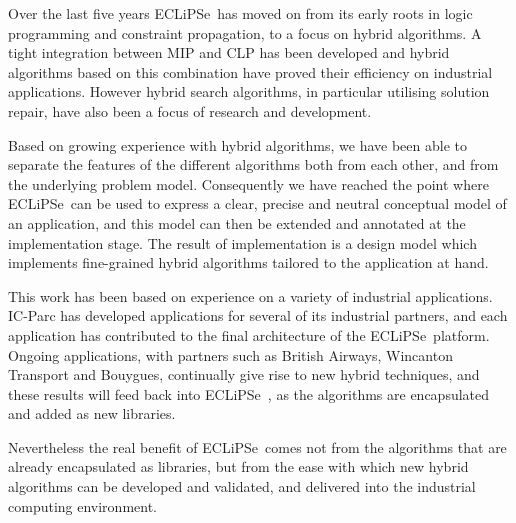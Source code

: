 \documentclass[a4wide]{article}
\newcommand{\ECL}{\mbox{ECLiPSe\ }{\hspace{1mm}}}
\begin{document}
Over the last five years \ECL has moved on from its early roots in
logic programming and constraint propagation, to  a focus on hybrid
algorithms.
A tight integration between MIP and CLP has been developed and hybrid
algorithms based on this combination have proved their efficiency on
industrial applications.
However hybrid search algorithms, in particular utilising solution
repair, 
have also been a focus of research and development.

Based on growing experience with hybrid algorithms, we have been able
to separate the features of the different algorithms both from each
other, and from the underlying problem model.
Consequently we have reached the point where \ECL can be used to
express a clear, precise and neutral  conceptual model of an
application, and this model can then be extended and annotated
at the implementation stage.
The result of implementation is
a design model which implements fine-grained hybrid
algorithms tailored to the application at hand.

This work has been based on experience on a variety of industrial
applications.
IC-Parc has developed applications for several of its industrial
partners, and each application has contributed to the final
architecture  of the \ECL platform.
Ongoing applications, with partners such as 
British Airways, Wincanton Transport
and Bouygues, 
continually give rise to new hybrid techniques,
and these results will feed back into \ECL, as the algorithms
are encapsulated and added as new libraries.

Nevertheless the real benefit of \ECL  comes not from the algorithms
that are already encapsulated as libraries, but from the ease with
which new hybrid algorithms can be developed and validated, and
delivered into the industrial computing environment.

\newpage 
\end{document}

